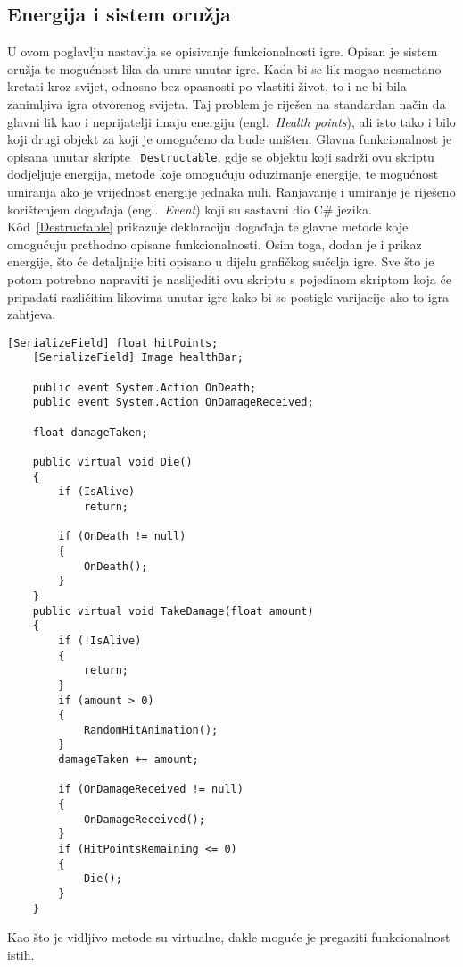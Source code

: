 \subsection{Energija i sistem oružja}
U ovom poglavlju nastavlja se opisivanje funkcionalnosti igre. Opisan je sistem
oružja te mogućnost lika da umre unutar igre.
Kada bi se lik mogao nesmetano kretati kroz svijet, odnosno bez opasnosti po
vlastiti život, to i ne bi bila zanimljiva igra otvorenog svijeta. Taj problem je
riješen na standardan način da glavni lik kao i neprijatelji imaju energiju
(engl.~\textit{Health points}), ali isto tako i bilo koji drugi objekt za koji je
omogućeno da bude uništen. Glavna funkcionalnost je opisana unutar skripte
~\texttt{Destructable}, gdje se objektu koji sadrži ovu skriptu dodjeljuje energija, metode
koje omogućuju oduzimanje energije, te mogućnost umiranja ako je vrijednost energije
jednaka nuli. Ranjavanje i umiranje je riješeno korištenjem događaja
(engl.~\textit{Event}) koji su sastavni dio C\# jezika. K\^od~\ref{Destructable}
prikazuje deklaraciju događaja te glavne metode koje omogućuju prethodno opisane
funkcionalnosti. Osim toga, dodan je i prikaz energije, što će detaljnije biti
opisano u dijelu grafičkog sučelja igre. Sve što je potom potrebno napraviti je
naslijediti ovu skriptu s pojedinom skriptom koja će pripadati različitim likovima
unutar igre kako bi se postigle varijacije ako to igra zahtjeva.
\begin{lstlisting}[caption={Energija lika}, label=Destructable]
    [SerializeField] float hitPoints;
    [SerializeField] Image healthBar;

    public event System.Action OnDeath;
    public event System.Action OnDamageReceived;

    float damageTaken;

    public virtual void Die()
    {
        if (IsAlive)
            return;

        if (OnDeath != null)
        {
            OnDeath();
        }
    }
    public virtual void TakeDamage(float amount)
    {
        if (!IsAlive)
        {
            return;
        }
        if (amount > 0)
        {
            RandomHitAnimation();
        }
        damageTaken += amount;

        if (OnDamageReceived != null)
        {
            OnDamageReceived();
        }
        if (HitPointsRemaining <= 0)
        {
            Die();
        }
    }
\end{lstlisting}
Kao što je vidljivo metode su virtualne, dakle moguće je pregaziti funkcionalnost
istih.


